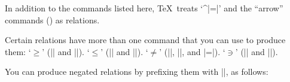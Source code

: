 In addition to the commands listed here, \TeX\ treats  `^|=|' and the
``arrow'' commands () as relations.

Certain relations have more than one command that you can use
to produce them:
\ulist \compact
\li `$\ge$' (|\ge| and |\geq|).
\li `$\le$' (|\le| and |\leq|).
\li `$\ne$' (|\ne|, |\neq|, and |\not=|).
\li `$\ni$' (|\ni| and |\owns|).
\endulist

\xrdef{\not}
You can produce negated relations by prefixing them with |\not|, as follows:

\nobreak
{}
\basicdisplay {$\not\asymp$}{\\not\\asymp}
\basicdisplay {$\not\cong$}{\\not\\cong}
\basicdisplay {$\not\equiv$}{\\not\\equiv}
\basicdisplay {$\not=$}{\\not=}\ttidxref{=}
\basicdisplay {$\not\ge$}{\\not\\ge}
\basicdisplay {$\not\geq$}{\\not\\geq}
\basicdisplay {$\not\le$}{\\not\\le}
\basicdisplay {$\not\leq$}{\\not\\leq}
\basicdisplay {$\not\prec$}{\\not\\prec}
\basicdisplay {$\not\preceq$}{\\not\\preceq}
\basicdisplay {$\not\succ$}{\\not\\succ}
\basicdisplay {$\not\succeq$}{\\not\\succeq}
\basicdisplay {$\not\approx$}{\\not\\approx}
\basicdisplay {$\not\sim$}{\\not\\sim}
\basicdisplay {$\not\simeq$}{\\not\\simeq}
